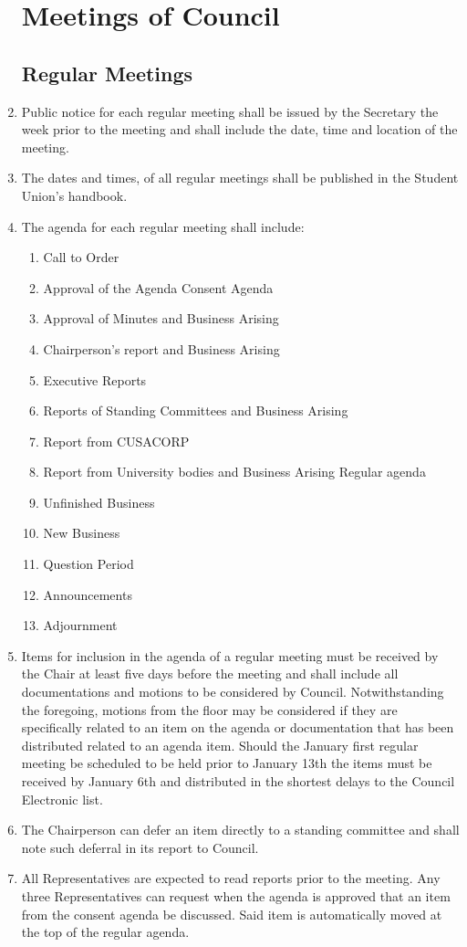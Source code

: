 \documentclass[oneside]{book}
\begin{document}
\begin{enumerate}
\chapter{\label{Meetings_of_Council}Meetings of Council }


\section{\label{Regular_Meetings}Regular Meetings }
\item Public notice for each regular meeting shall be issued by the Secretary
the week prior to the meeting and shall include the date, time and
location of the meeting. 
\item The dates and times, of all regular meetings shall be published in
the Student Union's handbook. 
\item The agenda for each regular meeting shall include: 

\begin{enumerate}
\item Call to Order 
\item Approval of the Agenda
Consent Agenda 
\item Approval of Minutes and Business Arising 
\item Chairperson's report and Business Arising 
\item Executive Reports 
\item Reports of Standing Committees and Business Arising 
\item Report from CUSACORP 
\item Report from University bodies and Business Arising
Regular agenda 
\item Unfinished Business 
\item New Business 
\item Question Period 
\item Announcements 
\item Adjournment 
\end{enumerate}
\item Items for inclusion in the agenda of a regular meeting must be received
by the Chair at least five days before the meeting and shall include
all documentations and motions to be considered by Council. Notwithstanding
the foregoing, motions from the floor may be considered if they are
specifically related to an item on the agenda or documentation that
has been distributed related to an agenda item. Should the January
first regular meeting be scheduled to be held prior to January 13th
the items must be received by January 6th and distributed in the shortest
delays to the Council Electronic list. 
\item The Chairperson can defer an item directly to a standing committee
and shall note such deferral in its report to Council. 
\item All Representatives are expected to read reports prior to the meeting.
Any three Representatives can request when the agenda is approved
that an item from the consent agenda be discussed. Said item is automatically
moved at the top of the regular agenda. 


\end{enumerate}
\end{document}
